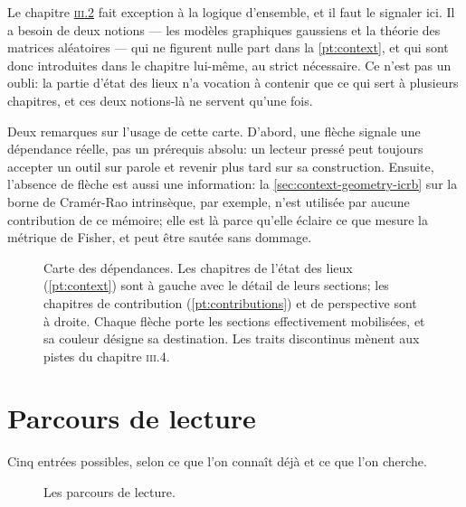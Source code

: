 Le chapitre \hyperref[ch:learning]{\textsc{iii}.2} fait exception à la logique
d'ensemble, et il faut le signaler ici. Il a besoin de deux notions --- les
modèles graphiques gaussiens et la théorie des matrices aléatoires --- qui ne
figurent nulle part dans la \cref{pt:context}, et qui sont donc introduites dans
le chapitre lui-même, au strict nécessaire. Ce n'est pas un oubli: la partie
d'état des lieux n'a vocation à contenir que ce qui sert à plusieurs chapitres,
et ces deux notions-là ne servent qu'une fois.

Deux remarques sur l'usage de cette carte. D'abord, une flèche signale une
dépendance réelle, pas un prérequis absolu: un lecteur pressé peut toujours
accepter un outil sur parole et revenir plus tard sur sa construction. Ensuite,
l'absence de flèche est aussi une information: la \cref{sec:context-geometry-icrb}
sur la borne de Cramér-Rao intrinsèque, par exemple, n'est utilisée par aucune
contribution de ce mémoire; elle est là parce qu'elle éclaire ce que mesure la
métrique de Fisher, et peut être sautée sans dommage.

\begin{figure}[p]
  \centering
  \makebox[\textwidth][c]{\scalebox{1.06}{}}
  \caption[Carte des dépendances du mémoire]{Carte des dépendances. Les
    chapitres de l'état des lieux (\cref{pt:context}) sont à gauche avec le
    détail de leurs sections; les chapitres de contribution
    (\cref{pt:contributions}) et de perspective sont à droite. Chaque flèche
    porte les sections effectivement mobilisées, et sa couleur désigne sa
    destination. Les traits discontinus mènent aux pistes du chapitre
    \textsc{iii}.4.}
  \label{fig:commentlire-carte}
\end{figure}

\section*{Parcours de lecture}
\label{sec:commentlire-parcours}

Cinq entrées possibles, selon ce que l'on connaît déjà et ce que l'on cherche.

\begin{figure}[htb]
  \centering
  \makebox[\textwidth][c]{}
  \caption[Les parcours de lecture]{Les parcours de lecture.}
  \label{fig:commentlire-parcours}
\end{figure}

